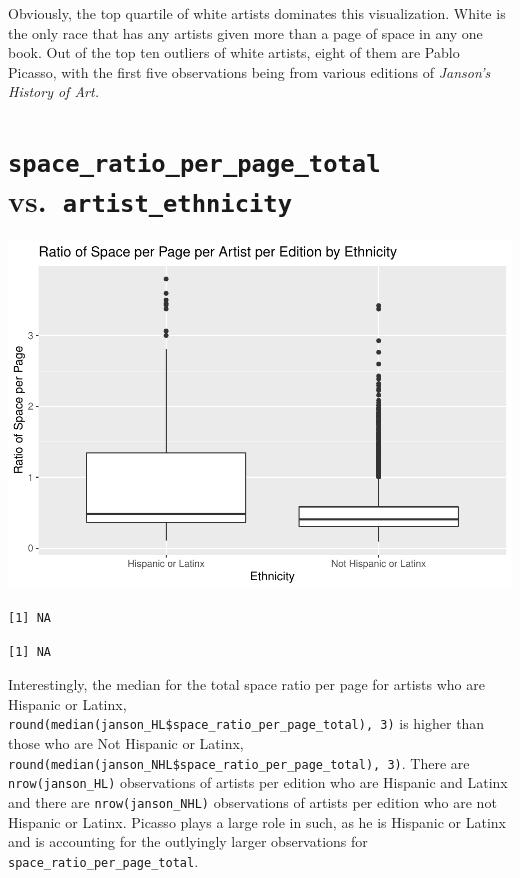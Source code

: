 \documentclass[
  letterpaper,
  DIV=11,
  numbers=noendperiod]{scrreprt}
\begin{document}
Obviously, the top quartile of white artists dominates this
visualization. White is the only race that has any artists given more
than a page of space in any one book. Out of the top ten outliers of
white artists, eight of them are Pablo Picasso, with the first five
observations being from various editions of \emph{Janson's History of
Art.}

\hypertarget{space_ratio_per_page_total-vs.-artist_ethnicity}{%
\section{\texorpdfstring{\texttt{space\_ratio\_per\_page\_total}
vs.~\texttt{artist\_ethnicity}}{space\_ratio\_per\_page\_total vs.~artist\_ethnicity}}\label{space_ratio_per_page_total-vs.-artist_ethnicity}}

\includegraphics{Chapter1/Chapter1_files/figure-pdf/ethnicityallbooks-1.pdf}

\begin{verbatim}
[1] NA
\end{verbatim}

\begin{verbatim}
[1] NA
\end{verbatim}

Interestingly, the median for the total space ratio per page for artists
who are Hispanic or Latinx,
\texttt{round(median(janson\_HL\$space\_ratio\_per\_page\_total),\ 3)}
is higher than those who are Not Hispanic or Latinx,
\texttt{round(median(janson\_NHL\$space\_ratio\_per\_page\_total),\ 3)}.
There are \texttt{nrow(janson\_HL)} observations of artists per edition
who are Hispanic and Latinx and there are \texttt{nrow(janson\_NHL)}
observations of artists per edition who are not Hispanic or Latinx.
Picasso plays a large role in such, as he is Hispanic or Latinx and is
accounting for the outlyingly larger observations for
\texttt{space\_ratio\_per\_page\_total}.
\end{document}
